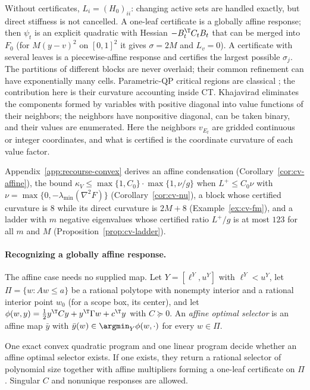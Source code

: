 \begin{remark}\label{rem:cv-instances}
Without certificates, $L_i=(H_0)_{ii}$: changing active sets are handled
exactly, but direct stiffness is not cancelled. A one-leaf certificate is a
globally affine response; then $\psi_t$ is an explicit quadratic with
Hessian $-B_t^{\T}C_tB_t$ that can be merged into $F_0$ (for $M(y-v)^2$ on
$[0,1]^2$ it gives $\sigma=2M$ and $L_v=0$). A certificate with several
leaves is a piecewise-affine response and certifies the largest possible
$\sigma_j$. The partitions of different blocks are never overlaid; their
common refinement can have exponentially many cells. Parametric-QP critical
regions are classical \cite{BemporadEtAl2002}; the contribution here is
their curvature accounting inside CT. Khajavirad \cite{Khajavirad2026PolyBox}
eliminates the components formed by variables with positive diagonal into
value functions of their neighbors; the neighbors have nonpositive diagonal,
can be taken binary, and their values are enumerated. Here the neighbors
$v_{E_t}$ are gridded continuous or integer coordinates, and what is
certified is the coordinate curvature of each value factor.
\end{remark}

Appendix~\ref{app:recourse-convex} derives an affine condensation
(Corollary~\ref{cor:cv-affine}), the bound
$\kappa_V\le\max\{1,C_0\}\cdot\max\{1,\nu/g\}$ when $L^+\le C_0\nu$ with
$\nu=\max\{0,-\lambda_{\min}(\nabla^2F)\}$ (Corollary~\ref{cor:cv-nu}), a
block whose certified curvature is $8$ while its direct curvature is $2M+8$
(Example~\ref{ex:cv-fm}), and a ladder with $m$ negative eigenvalues whose
certified ratio $L^+/g$ is at most $123$ for all $m$ and $M$
(Proposition~\ref{prop:cv-ladder}).

\paragraph{Recognizing a globally affine response.}
The affine case needs no supplied map. Let $Y=[\ell^Y,u^Y]$ with
$\ell^Y<u^Y$, let $\Pi=\{w:Aw\le a\}$ be a rational polytope with nonempty
interior and a rational interior point $w_0$ (for a scope box, its center),
and let $\phi(w,y)=\frac12y^{\T}Cy+y^{\T}\Gamma w+c^{\T}y$ with $C\succeq0$.
An \emph{affine optimal selector} is an affine map $\bar y$ with
$\bar y(w)\in\argmin_{Y}\phi(w,\cdot)$ for every $w\in\Pi$.

\begin{theorem}\label{thm:cv-recog}
One exact convex quadratic program and one linear program decide whether an
affine optimal selector exists. If one exists, they return a rational
selector of polynomial size together with affine multipliers forming a
one-leaf certificate on $\Pi$. Singular $C$ and nonunique responses are
allowed.
\end{theorem}

